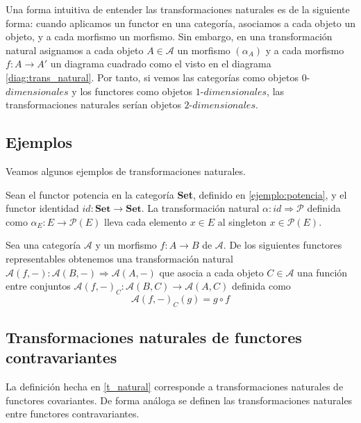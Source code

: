 Una forma intuitiva de entender las transformaciones naturales es de la siguiente forma: cuando aplicamos un functor en una categoría, asociamos a cada objeto un objeto, y a cada morfismo un morfismo. Sin embargo, en una transformación natural asignamos a cada objeto $A \in \mathscr{A}$ un morfismo $(\alpha_{A})$ y a cada morfismo $f: A \longrightarrow A'$ un diagrama cuadrado como el visto en el diagrama \ref{diag:trans_natural}. Por tanto, si vemos las categorías como objetos $0$-$dimensionales$ y los functores como objetos $1$-$dimensionales$, las transformaciones naturales serían objetos $2$-$dimensionales$. 

\subsection{Ejemplos}
Veamos algunos ejemplos de transformaciones naturales.

\begin{ejemplo}
    Sean el functor potencia en la categoría \textbf{Set}, definido en \ref{ejemplo:potencia}, y el functor identidad $id: \textbf{Set} \longrightarrow \textbf{Set}$. La transformación natural $\alpha: id \Rightarrow \mathcal{P}$ definida como $\alpha_{E}: E \longrightarrow \mathcal{P}(E)$ lleva cada elemento $x \in E$ al singleton ${x} \in \mathcal{P}(E)$.
\end{ejemplo}

\begin{ejemplo}
    Sea una categoría $\mathscr{A}$ y un morfismo $f:A \longrightarrow B$ de $\mathscr{A}$. De los siguientes functores representables obtenemos una transformación natural $\mathscr{A}(f,-) : \mathscr{A}(B,-) \Rightarrow \mathscr{A}(A,-)$  que asocia a cada objeto $C \in \mathscr{A}$ una función entre conjuntos $\mathscr{A}(f,-)_{C}: \mathscr{A}(B,C) \longrightarrow \mathscr{A}(A,C)$ definida como \begin{equation}
        \mathscr{A}(f,-)_{C}(g) = g \circ f
    \end{equation}
\end{ejemplo}

\subsection{Transformaciones naturales de functores contravariantes}
La definición hecha en \ref{t_natural} corresponde a transformaciones naturales de functores covariantes. De forma análoga se definen las transformaciones naturales entre functores contravariantes. 

